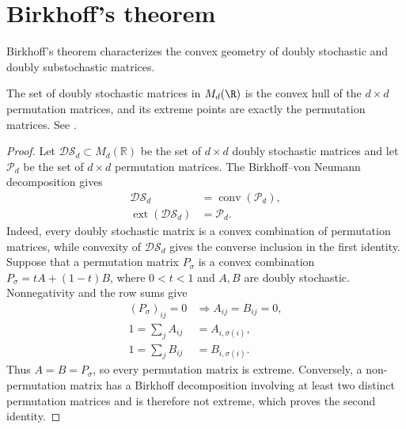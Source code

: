 
\section{Birkhoff's theorem}

Birkhoff's theorem characterizes the convex geometry of doubly
stochastic and doubly substochastic matrices.

\begin{theorem}
    \label{thm:birkhoff_doubly_stochastic}
    \leanok
    The set of doubly stochastic matrices in $M_d(\R)$ is the convex
    hull of the $d\times d$ permutation matrices, and its extreme
    points are exactly the permutation matrices.
    See \cite[Chapter~8, Theorem~8.6]{Wolf2012Quantum}.
\end{theorem}

\begin{proof}\leanok
    Let $\mathcal{DS}_d \subset M_d(\mathbb{R})$ be the set of $d \times d$
    doubly stochastic matrices and let $\mathcal{P}_d$ be the set of
    $d \times d$ permutation matrices.  The Birkhoff--von Neumann
    decomposition gives
    \begin{align}
      \mathcal{DS}_d &= \operatorname{conv}(\mathcal{P}_d), \\
      \operatorname{ext}(\mathcal{DS}_d) &= \mathcal{P}_d .
    \end{align}
    Indeed, every doubly stochastic matrix is a convex combination of
    permutation matrices, while convexity of $\mathcal{DS}_d$ gives the
    converse inclusion in the first identity.  Suppose that a permutation
    matrix $P_\sigma$ is a convex combination
    $P_\sigma=tA+(1-t)B$, where $0<t<1$ and $A,B$ are doubly stochastic.
    Nonnegativity and the row sums give
    \begin{align}
      (P_\sigma)_{ij}=0
      &\Longrightarrow A_{ij}=B_{ij}=0, \\
      1=\sum_j A_{ij} &= A_{i,\sigma(i)}, \\
      1=\sum_j B_{ij} &= B_{i,\sigma(i)}.
    \end{align}
    Thus $A=B=P_\sigma$, so every permutation matrix is extreme.
    Conversely, a non-permutation matrix has a Birkhoff decomposition
    involving at least two distinct permutation matrices and is therefore
    not extreme, which proves the second identity.
\end{proof}

